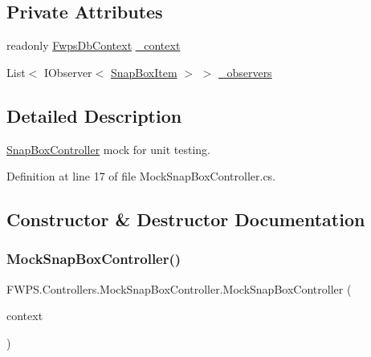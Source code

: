 \subsection*{Private Attributes}
\begin{DoxyCompactItemize}
\item 
readonly \mbox{\hyperlink{class_f_w_p_s_1_1_data_1_1_fwps_db_context}{Fwps\+Db\+Context}} \mbox{\hyperlink{class_f_w_p_s_1_1_controllers_1_1_mock_snap_box_controller_ad51374eeb0f7bf4e752202efa7d80ad5}{\+\_\+context}}
\item 
List$<$ I\+Observer$<$ \mbox{\hyperlink{class_f_w_p_s_1_1_models_1_1_snap_box_item}{Snap\+Box\+Item}} $>$ $>$ \mbox{\hyperlink{class_f_w_p_s_1_1_controllers_1_1_mock_snap_box_controller_a13d7fba95c599936c2db09c657c9728f}{\+\_\+observers}}
\end{DoxyCompactItemize}


\subsection{Detailed Description}
\mbox{\hyperlink{class_f_w_p_s_1_1_controllers_1_1_snap_box_controller}{Snap\+Box\+Controller}} mock for unit testing. 

Definition at line 17 of file Mock\+Snap\+Box\+Controller.\+cs.



\subsection{Constructor \& Destructor Documentation}
\mbox{\label{class_f_w_p_s_1_1_controllers_1_1_mock_snap_box_controller_a46c3a0f34d0ad6d3e14bd6875b80f815}} 
\subsubsection{\texorpdfstring{Mock\+Snap\+Box\+Controller()}{MockSnapBoxController()}}
{\footnotesize\ttfamily F\+W\+P\+S.\+Controllers.\+Mock\+Snap\+Box\+Controller.\+Mock\+Snap\+Box\+Controller (\begin{DoxyParamCaption}\item[{\mbox{\hyperlink{class_f_w_p_s_1_1_data_1_1_fwps_db_context}{Fwps\+Db\+Context}}}]{context }\end{DoxyParamCaption})}



